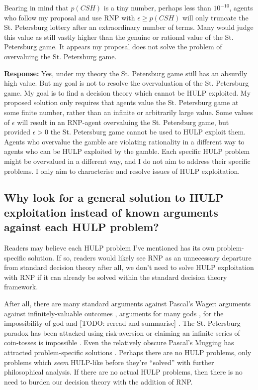 \documentclass{article}
\begin{document}
Bearing in mind that \(p(CSH)\) is a tiny number, perhaps less than \(10^{-10}\), agents who follow my proposal and use RNP with \(\epsilon \geq p(CSH)\) will only truncate the St. Petersburg lottery after an extraordinary number of terms. Many would judge this value as still vastly higher than the genuine or rational value of the St. Petersburg game. It appears my proposal does not solve the problem of overvaluing the St. Petersburg game. 

\textbf{Response:} Yes, under my theory the St. Petersburg game still has an absurdly high value. But my goal is not to resolve the overvaluation of the St. Petersburg game. My goal is to find a decision theory which cannot be HULP exploited. My proposed solution only requires that agents value the St. Petersburg game at some finite number, rather than an infinite or arbitrarily large value. Some values of \(\epsilon\) will result in an RNP-agent overvaluing the St. Petersburg game, but provided \(\epsilon>0\) the St. Petersburg game cannot be used to HULP exploit them. Agents who overvalue the gamble are violating rationality in a different way to agents who can be HULP exploited by the gamble. Each specific HULP problem might be overvalued in a different way, and I do not aim to address their specific problems. I only aim to characterise and resolve issues of HULP exploitation.

\subsection{Why look for a general solution to HULP exploitation instead of known arguments against each HULP problem?} 

Readers may believe each HULP problem I've mentioned has its own problem-specific solution. If so, readers would likely see RNP as an unnecessary departure from standard decision theory \textemdash{} after all, we don't need to solve HULP exploitation with RNP if it can already be solved within the standard decision theory framework.

After all, there are many standard arguments against Pascal's Wager: arguments against infinitely-valuable outcomes \citep{mcclennen1994pascal}, arguments for many gods \citep{saka2001pascal}, for the impossibility of god \citep{oppy1991rescher} and [TODO: reread and summarise] \citep{hajek2003waging}. The St. Petersburg paradox has been attacked using risk-aversion \citep{weirich1984st} or claiming an infinite series of coin-tosses is impossible \citep[pg. 154]{jeffrey1990logic}. Even the relatively obscure Pascal's Mugging has attracted problem-specific solutions \citep{baumann2009counting}. Perhaps there are no HULP problems, only problems which \textit{seem} HULP-like before they're ``solved'' with further philosophical analysis. If there are no actual HULP problems, then there is no need to burden our decision theory with the addition of RNP.
\end{document}
